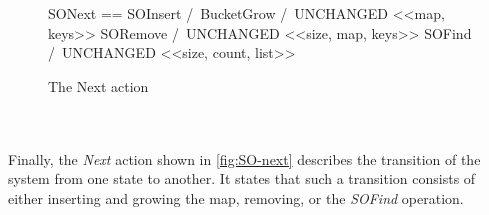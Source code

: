 \documentclass{uit-thesis}
\begin{document}
\begin{figure}
    \begin{tla}
        SONext ==   \/ SOInsert /\ BucketGrow /\ UNCHANGED <<map, keys>>
            \/ SORemove /\ UNCHANGED <<size, map, keys>>
            \/ SOFind   /\ UNCHANGED <<size, count, list>>
    \end{tla}
\begin{tlatex}
\end{tlatex}
    \caption{The Next action}
    \label{fig:SO-next}
\end{figure}
\\\\
Finally, the \textit{Next} action shown in \autoref{fig:SO-next} describes the transition of the system from one state to another. It states that such a transition consists of either inserting and growing the map, removing, or the \textit{SOFind} operation.
\end{document}
